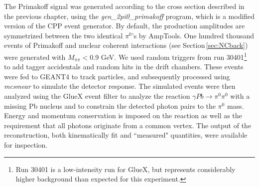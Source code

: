 The Primakoff signal was generated according to the cross section
described in the previous chapter, using the
\emph{gen\_2pi0\_primakoff} program, which is a modified version of the CPP event generator. By default, the production amplitudes are
symmetrized between the two identical $\pi^0$'s by AmpTools. One
hundred thousand events of Primakoff and nuclear coherent interactions 
(see Section\,\ref{sec:NCback}) were generated with $M_{\pi\pi}<$0.9 GeV.
We used random triggers from run 30401\footnote{Run 30401 is a low-intensity run for GlueX,
but represents considerably higher background than expected for this experiment.} to add tagger accidentals 
and random hits in the drift chambers. These events were fed to GEANT4 to track particles, and subsequently
processed using \emph{mcsmear} to simulate the detector response. The
simulated events were then analyzed using the GlueX event filter to
analyze the reaction $\gamma Pb \rightarrow \pi^0 \pi^0$ with a
missing Pb nucleus and to constrain the detected photon pairs to the
$\pi^0$ mass. Energy and momentum conservation is imposed on the reaction as well as the requirement that all photons originate from a common vertex. The output of the reconstruction, both kinematically
fit and ``measured" quantities, were available for inspection.

